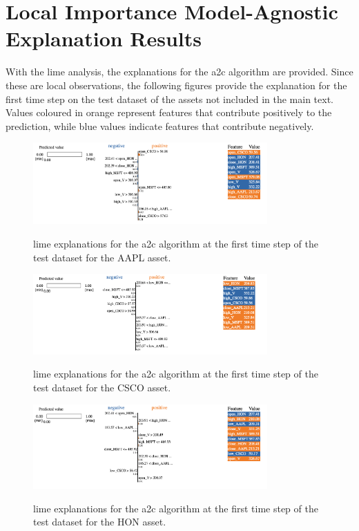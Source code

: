 \clearpage
\section{Local Importance Model-Agnostic Explanation Results} \label{app:lime_explanations}

With the \acrshort{lime} analysis, the explanations for the \acrshort{a2c} algorithm are provided. Since these are local observations, the following figures provide the explanation for the first time step on the test dataset of the assets not included in the main text. Values coloured in orange represent features that contribute positively to the prediction, while blue values indicate features that contribute negatively.

\begin{figure}
    \centering
    \includegraphics[width=0.8\textwidth]{figures/a2c_lime_aapl.png}
    \label{fig:a2c_lime_aapl}
    \caption{\acrshort{lime} explanations for the \acrshort{a2c} algorithm at the first time step of the test dataset for the AAPL asset.}
\end{figure}

\begin{figure}
    \centering
    \includegraphics[width=0.8\textwidth]{figures/a2c_lime_csco.png}
    \label{fig:a2c_lime_csco}
    \caption{\acrshort{lime} explanations for the \acrshort{a2c} algorithm at the first time step of the test dataset for the CSCO asset.}
\end{figure}

\begin{figure}
    \centering
    \includegraphics[width=0.8\textwidth]{figures/a2c_lime_hon.png}
    \label{fig:a2c_lime_hon}
    \caption{\acrshort{lime} explanations for the \acrshort{a2c} algorithm at the first time step of the test dataset for the HON asset.}
\end{figure}

